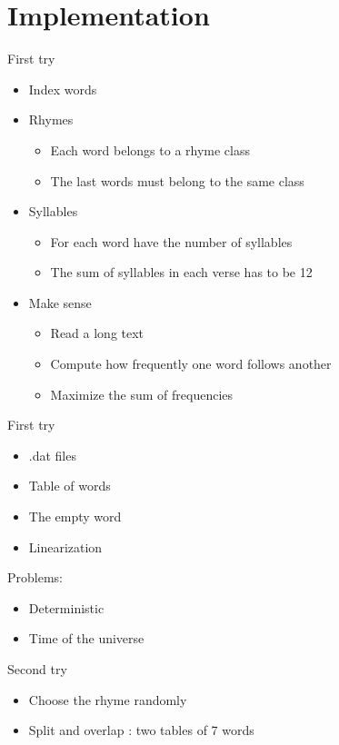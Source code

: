\documentclass[unknownkeysallowed]{beamer}
\begin{document}
\section{Implementation}


\begin{frame}[fragile]{First try}
\begin{itemize}
\item Index words
\item Rhymes
\begin{itemize}
\item Each word belongs to a rhyme class
\item The last words must belong to the same class
\end{itemize}
\item Syllables
\begin{itemize}
\item For each word have the number of syllables
\item The sum of syllables in each verse has to be 12
\end{itemize}
\item Make sense
\begin{itemize}
\item Read a long text
\item Compute how frequently one word follows another
\item Maximize the sum of frequencies 
\end{itemize}
\end{itemize}
\end{frame}

\begin{frame}[fragile]{First try}
\begin{itemize}
\item .dat files
\item Table of words
\item The empty word
\item Linearization
\end{itemize}

Problems: 

\begin{itemize}
\item Deterministic
\item Time of the universe
\end{itemize}
\end{frame}

\begin{frame}[fragile]{Second try}
\begin{itemize}
\item Choose the rhyme randomly
\medskip
\item Split and overlap : two tables of 7 words
\end{itemize}
\end{frame}
\end{document}
